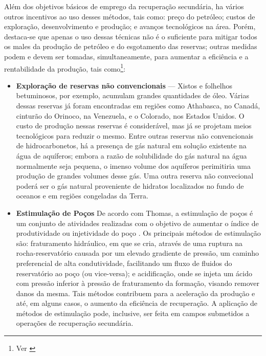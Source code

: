 Al\'{e}m dos objetivos b\'{a}sicos de emprego da recupera\c{c}\~{a}o secund\'{a}ria, ha v\'{a}rios outros incentivos ao uso desses m\'{e}todos, tais como: pre\c{c}o do petr\'{o}leo; custos de explora\c{c}\~{a}o, desenvolvimento e produ\c{c}\~{a}o; e avan\c{c}os tecnol\'{o}gicos na \'{a}rea. Por\'{e}m, destaca-se que apenas o uso dessas t\'{e}cnicas n\~{a}o \'{e} o suficiente para mitigar todos os males da produ\c{c}\~{a}o de petr\'{o}leo e do esgotamento das reservas; outras medidas podem e devem ser tomadas, simultaneamente, para aumentar a efici\^{e}ncia e a rentabilidade da produ\c{c}\~{a}o, tais como\footnote{Ver \cite{engres}}:
\begin{itemize}
\item \textbf{Explora\c{c}\~{a}o de reservas n\~{a}o convencionais} --- Xistos e folhelhos betuminosos, por exemplo, acumulam grandes quantidades de \'{o}leo. V\'{a}rias dessas reservas j\'{a} foram encontradas em regi\~{o}es como Athabasca, no Canad\'{a}, cintur\~{a}o do Orinoco, na Venezuela, e o Colorado, nos Estados Unidos. O custo de produ\c{c}\~{a}o nessas reservas \'{e} consider\'{a}vel, mas j\'{a} se projetam meios tecnol\'{o}gicos para reduzir o mesmo. Entre outras reservas n\~{a}o convencionais de hidrocarbonetos, h\'{a} a presen\c{c}a de g\'{a}s natural em solu\c{c}\~{a}o existente na \'{a}gua de aqu\'{i}feros; embora a raz\~{a}o de solubilidade do g\'{a}s natural na \'{a}gua normalmente seja pequena, o imenso volume dos aqu\'{i}feros perimitiria uma produ\c{c}\~{a}o de grandes volumes desse g\'{a}s. Uma outra reserva n\~{a}o convecional poder\'{a} ser o g\'{a}s natural proveniente de hidratos localizados no fundo de oceanos e em regi\~{o}es congeladas da Terra.
\item \textbf{Estimula\c{c}\~{a}o de Po\c{c}os} De acordo com Thomas, a estimula\c{c}\~{a}o de po\c{c}os \'{e} um conjunto de atividades realizadas com o objetivo de aumentar o \'{i}ndice de produtividade ou injetividade do po\c{c}o \cite[p.~166]{engpetro}. Os principais m\'{e}todos de estimula\c{c}\~{a}o s\~{a}o: fraturamento hidr\'{a}ulico, em que se cria, atrav\'{e}s de uma ruptura na rocha-reservat\'{o}rio causada por um elevado gradiente de press\~{a}o, um caminho preferencial de alta condutividade, facilitando um fluxo de fluidos do reservat\'{o}rio ao po\c{c}o (ou vice-versa); e acidifica\c{c}\~{a}o, onde se injeta um \'{a}cido com press\~{a}o inferior \`{a} press\~{a}o de fraturamento da forma\c{c}\~{a}o, visando remover danos da mesma. Tais m\'{e}todos contribuem para a acelera\c{c}\~{a}o da produ\c{c}\~{a}o e at\'{e}, em alguns casos, o aumento da efici\^{e}ncia de recupera\c{c}\~{a}o. A aplica\c{c}\~{a}o de m\'{e}todos de estimula\c{c}\~{a}o pode, inclusive, ser feita em campos submetidos a opera\c{c}\~{o}es de recupera\c{c}\~{a}o secund\'{a}ria.

\end{itemize}
